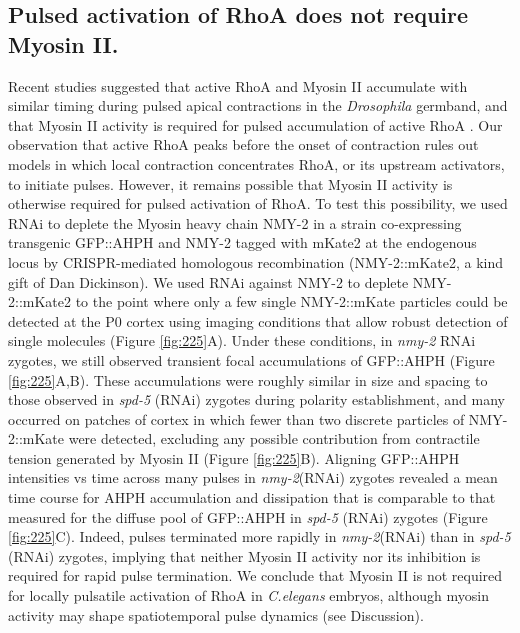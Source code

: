 \subsection{Pulsed activation of RhoA does not require Myosin II.}
Recent studies suggested that active RhoA and Myosin II accumulate with similar timing during pulsed apical contractions in the \textit{Drosophila} germband, and that Myosin II activity is required for pulsed accumulation of active RhoA  \cite{Munjal:2015bx}. Our observation that active RhoA peaks before the onset of contraction rules out models in which local contraction concentrates RhoA, or its upstream activators, to initiate pulses. However, it remains possible that Myosin II activity is otherwise required for pulsed activation of RhoA. To test this possibility, we used RNAi to deplete the Myosin heavy chain NMY-2 in a strain co-expressing transgenic GFP::AHPH and NMY-2 tagged with mKate2 at the endogenous locus by CRISPR-mediated homologous recombination (NMY-2::mKate2, a kind gift of Dan Dickinson).  We used RNAi against NMY-2 to deplete NMY-2::mKate2 to the point where only a few single NMY-2::mKate particles could be detected at the P0 cortex using imaging conditions that allow robust detection of single molecules (Figure \ref{fig:225}A). Under these conditions, in \textit{nmy-2} RNAi zygotes, we still observed transient focal accumulations of GFP::AHPH (Figure \ref{fig:225}A,B).  These accumulations were roughly similar in size and spacing to those observed in \textit{spd-5} (RNAi) zygotes during polarity establishment, and many occurred on patches of cortex in which fewer than two discrete particles of NMY-2::mKate were detected, excluding any possible contribution from contractile tension generated by Myosin II (Figure \ref{fig:225}B). Aligning GFP::AHPH intensities vs time across many pulses in \textit{nmy-2}(RNAi) zygotes revealed a mean time course for AHPH accumulation and dissipation that is comparable to that measured for the diffuse pool of GFP::AHPH in \textit{spd-5} (RNAi) zygotes (Figure \ref{fig:225}C).  Indeed, pulses terminated more rapidly in \textit{nmy-2}(RNAi) than in \textit{spd-5} (RNAi) zygotes, implying that neither Myosin II activity nor its inhibition is required for rapid pulse termination. We conclude that Myosin II is not required for locally pulsatile activation of RhoA in \textit{C.elegans} embryos, although myosin activity may shape spatiotemporal pulse dynamics (see Discussion).

